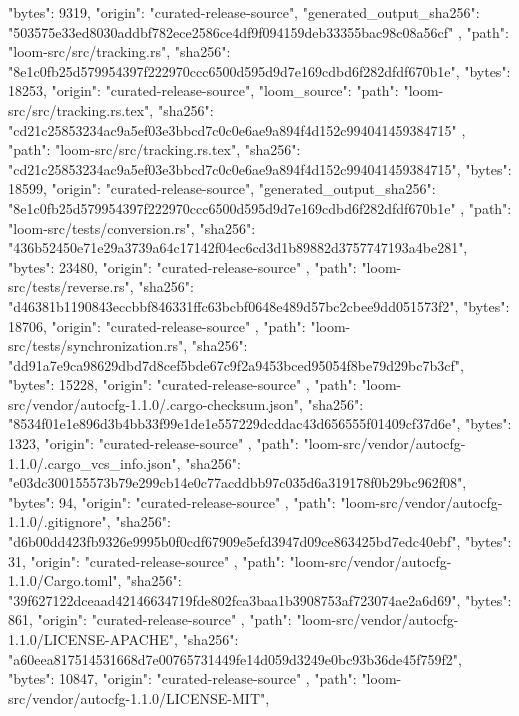 {{      "bytes": 9319,
      "origin": "curated-release-source",
      "generated_output_sha256": "503575e33ed8030addbf782ece2586ce4df9f094159deb33355bac98c08a56cf"
    },
    {
      "path": "loom-src/src/tracking.rs",
      "sha256": "8e1c0fb25d579954397f222970ccc6500d595d9d7e169cdbd6f282dfdf670b1e",
      "bytes": 18253,
      "origin": "curated-release-source",
      "loom_source": {
        "path": "loom-src/src/tracking.rs.tex",
        "sha256": "cd21c25853234ac9a5ef03e3bbcd7c0c0e6ae9a894f4d152c994041459384715"
      }
    },
    {
      "path": "loom-src/src/tracking.rs.tex",
      "sha256": "cd21c25853234ac9a5ef03e3bbcd7c0c0e6ae9a894f4d152c994041459384715",
      "bytes": 18599,
      "origin": "curated-release-source",
      "generated_output_sha256": "8e1c0fb25d579954397f222970ccc6500d595d9d7e169cdbd6f282dfdf670b1e"
    },
    {
      "path": "loom-src/tests/conversion.rs",
      "sha256": "436b52450e71e29a3739a64c17142f04ec6cd3d1b89882d3757747193a4be281",
      "bytes": 23480,
      "origin": "curated-release-source"
    },
    {
      "path": "loom-src/tests/reverse.rs",
      "sha256": "d46381b1190843eccbbf846331ffc63bcbf0648e489d57bc2cbee9dd051573f2",
      "bytes": 18706,
      "origin": "curated-release-source"
    },
    {
      "path": "loom-src/tests/synchronization.rs",
      "sha256": "dd91a7e9ca98629dbd7d8cef5bde67c9f2a9453bced95054f8be79d29bc7b3cf",
      "bytes": 15228,
      "origin": "curated-release-source"
    },
    {
      "path": "loom-src/vendor/autocfg-1.1.0/.cargo-checksum.json",
      "sha256": "8534f01e1e896d3b4bb33f99e1de1e557229dcddac43d656555f01409cf37d6e",
      "bytes": 1323,
      "origin": "curated-release-source"
    },
    {
      "path": "loom-src/vendor/autocfg-1.1.0/.cargo_vcs_info.json",
      "sha256": "e03dc300155573b79e299cb14e0c77acddbb97c035d6a319178f0b29bc962f08",
      "bytes": 94,
      "origin": "curated-release-source"
    },
    {
      "path": "loom-src/vendor/autocfg-1.1.0/.gitignore",
      "sha256": "d6b00dd423fb9326e9995b0f0cdf67909e5efd3947d09ce863425bd7edc40ebf",
      "bytes": 31,
      "origin": "curated-release-source"
    },
    {
      "path": "loom-src/vendor/autocfg-1.1.0/Cargo.toml",
      "sha256": "39f627122dceaad42146634719fde802fca3baa1b3908753af723074ae2a6d69",
      "bytes": 861,
      "origin": "curated-release-source"
    },
    {
      "path": "loom-src/vendor/autocfg-1.1.0/LICENSE-APACHE",
      "sha256": "a60eea817514531668d7e00765731449fe14d059d3249e0bc93b36de45f759f2",
      "bytes": 10847,
      "origin": "curated-release-source"
    },
    {
      "path": "loom-src/vendor/autocfg-1.1.0/LICENSE-MIT",
}}
